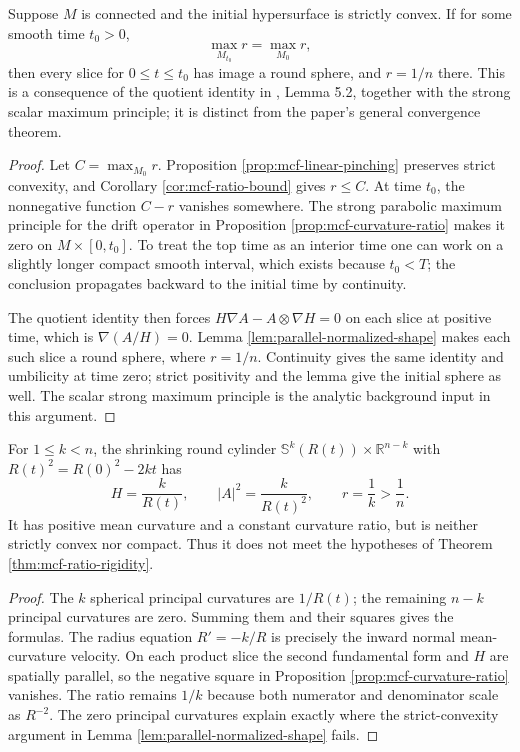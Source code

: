 \begin{theorem}\label{thm:mcf-ratio-rigidity}
Suppose $M$ is connected and the initial hypersurface is strictly convex. If for some smooth time $t_0>0$,
\[
 \max_{M_{t_0}}r=\max_{M_0}r,
\]
then every slice for $0\leq t\leq t_0$ has image a round sphere, and $r=1/n$ there. This is a consequence of the quotient identity in \cite{Hui84}, Lemma 5.2, together with the strong scalar maximum principle; it is distinct from the paper's general convergence theorem.
\end{theorem}
\begin{proof}
Let $C=\max_{M_0}r$. Proposition \ref{prop:mcf-linear-pinching} preserves strict convexity, and Corollary \ref{cor:mcf-ratio-bound} gives $r\leq C$. At time $t_0$, the nonnegative function $C-r$ vanishes somewhere. The strong parabolic maximum principle for the drift operator in Proposition \ref{prop:mcf-curvature-ratio} makes it zero on $M\times[0,t_0]$. To treat the top time as an interior time one can work on a slightly longer compact smooth interval, which exists because $t_0<T$; the conclusion propagates backward to the initial time by continuity.

The quotient identity then forces $H\nabla A-A\otimes\nabla H=0$ on each slice at positive time, which is $\nabla(A/H)=0$. Lemma \ref{lem:parallel-normalized-shape} makes each such slice a round sphere, where $r=1/n$. Continuity gives the same identity and umbilicity at time zero; strict positivity and the lemma give the initial sphere as well. The scalar strong maximum principle is the analytic background input in this argument.
\end{proof}

\begin{example}\label{ex:cylinder-curvature-ratio}
For $1\leq k<n$, the shrinking round cylinder $\mathbb S^k(R(t))\times\mathbb R^{n-k}$ with $R(t)^2=R(0)^2-2kt$ has
\[
 H=\frac{k}{R(t)},\qquad |A|^2=\frac{k}{R(t)^2},\qquad r=\frac1k>\frac1n.
\]
It has positive mean curvature and a constant curvature ratio, but is neither strictly convex nor compact. Thus it does not meet the hypotheses of Theorem \ref{thm:mcf-ratio-rigidity}.
\end{example}
\begin{proof}
The $k$ spherical principal curvatures are $1/R(t)$; the remaining $n-k$ principal curvatures are zero. Summing them and their squares gives the formulas. The radius equation $R'=-k/R$ is precisely the inward normal mean-curvature velocity. On each product slice the second fundamental form and $H$ are spatially parallel, so the negative square in Proposition \ref{prop:mcf-curvature-ratio} vanishes. The ratio remains $1/k$ because both numerator and denominator scale as $R^{-2}$. The zero principal curvatures explain exactly where the strict-convexity argument in Lemma \ref{lem:parallel-normalized-shape} fails.
\end{proof}
